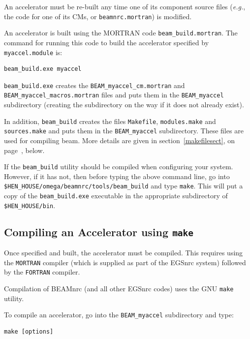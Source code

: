 \documentclass[12pt,twoside]{article}
\begin{document}
An accelerator must be re-built any time one of its component source files
({\em e.g.}, the code for one of its CMs, or {\tt beamnrc.mortran}) is
modified.

An accelerator is built using the MORTRAN code {\tt beam\_build.mortran}.
The command for running this code to build the accelerator specified
by {\tt myaccel.module} is:
\begin{verbatim}
beam_build.exe myaccel
\end{verbatim}
{\tt beam\_build.exe} creates the
{\tt BEAM\_myaccel\_cm.mortran} and {\tt BEAM\_myaccel\_macros.mortran} files
and puts them in the {\tt BEAM\_myaccel} subdirectory (creating the subdirectory
on the way if it does not already exist).

In addition, {\tt beam\_build} creates
the files {\tt Makefile}, {\tt modules.make} and {\tt sources.make} and
puts them in the {\tt BEAM\_myaccel} subdirectory.  These files
are used for compiling beam.
More details
are given in section~\ref{makefilesect}, on
page~\pageref{makefilesect}, below.

If the {\tt beam\_build} utility should be compiled when configuring your
system.  However, if it has not, then before typing the above command line, go into
{\tt \$HEN\_HOUSE/omega/beamnrc/tools/beam\_build} and type {\tt make}.  This
will put a copy of the {\tt beam\_build.exe} executable in the appropriate
subdirectory of {\tt \$HEN\_HOUSE/bin}.

\subsection{Compiling an Accelerator using {\tt make}}
\label{ca}

Once specified and built, the accelerator must be compiled. This
requires using the \verb+MORTRAN+ compiler (which is supplied as part of
the EGSnrc system) followed by the \verb+FORTRAN+ compiler.

Compilation of BEAMnrc (and all other EGSnrc codes) uses the GNU
{\tt make} utility.

To compile an accelerator, go into the {\tt BEAM\_myaccel}
subdirectory and type:
\begin{verbatim}
make [options]
\end{verbatim}
\end{document}
